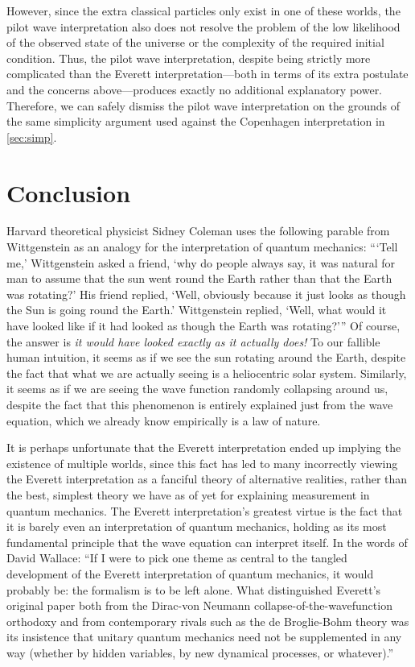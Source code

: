 \documentclass[
    12pt,
    letterpaper,
    aps,
    prd,
    longbibliography,
    twocolumn,
    nofootinbib,
    raggedbottom,
    amsmath,
    amssymb,
    amsfonts,
]{revtex4-1}
\begin{document}
However, since the extra classical particles only exist in one of these worlds, the pilot wave interpretation also does not resolve the problem of the low likelihood of the observed state of the universe\cite{falsification} or the complexity of the required initial condition\cite{arrowoftime}. Thus, the pilot wave interpretation, despite being strictly more complicated than the Everett interpretation---both in terms of its extra postulate and the concerns above---produces exactly no additional explanatory power. Therefore, we can safely dismiss the pilot wave interpretation on the grounds of the same simplicity argument used against the Copenhagen interpretation in \autoref{sec:simp}.

\section{Conclusion}

Harvard theoretical physicist Sidney Coleman uses the following parable from Wittgenstein as an analogy for the interpretation of quantum mechanics: ```Tell me,' Wittgenstein asked a friend, `why do people always say, it was natural for man to assume that the sun went round the Earth rather than that the Earth was rotating?' His friend replied, `Well, obviously because it just looks as though the Sun is going round the Earth.' Wittgenstein replied, `Well, what would it have looked like if it had looked as though the Earth was rotating?'''\cite{inyourface} Of course, the answer is \textit{it would have looked exactly as it actually does!} To our fallible human intuition, it seems as if we see the sun rotating around the Earth, despite the fact that what we are actually seeing is a heliocentric solar system. Similarly, it seems as if we are seeing the wave function randomly collapsing around us, despite the fact that this phenomenon is entirely explained just from the wave equation, which we already know empirically is a law of nature.

It is perhaps unfortunate that the Everett interpretation ended up implying the existence of multiple worlds, since this fact has led to many incorrectly viewing the Everett interpretation as a fanciful theory of alternative realities, rather than the best, simplest theory we have as of yet for explaining measurement in quantum mechanics. The Everett interpretation's greatest virtue is the fact that it is barely even an interpretation of quantum mechanics, holding as its most fundamental principle that the wave equation can interpret itself. In the words of David Wallace: ``If I were to pick one theme as central to the tangled development of the Everett interpretation of quantum mechanics, it would probably be: the formalism is to be left alone. What distinguished Everett’s original paper both from the Dirac-von Neumann collapse-of-the-wavefunction orthodoxy and from contemporary rivals such as the de Broglie-Bohm theory was its insistence that unitary quantum mechanics need not be supplemented in any way (whether by hidden variables, by new dynamical processes, or whatever).''\cite{bornproof2}
\end{document}
